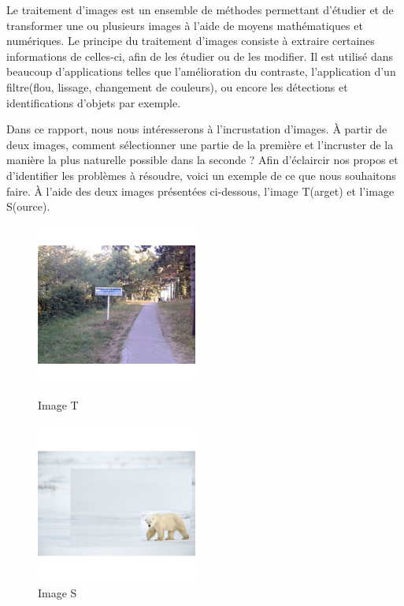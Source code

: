 
Le traitement d'images est un ensemble de méthodes permettant d'étudier et de transformer une ou plusieurs images à l'aide de moyens mathématiques et numériques. Le principe du traitement d'images consiste à extraire certaines informations de celles-ci, afin de les étudier ou de les modifier. Il est utilisé dans beaucoup d'applications telles que l'amélioration du contraste, l'application d'un filtre(flou, lissage, changement de couleurs), ou encore les détections et identifications d'objets par exemple. 

Dans ce rapport, nous nous intéresserons à l'incrustation d'images. À partir de deux images, comment sélectionner une partie de la première et l'incruster de la manière la plus naturelle possible dans la seconde ? 
\newline
Afin d'éclaircir nos propos et d'identifier les problèmes à résoudre, voici un exemple de ce que nous souhaitons faire.\newline
À l'aide des deux images présentées ci-dessous, l'image T(arget) et l'image S(ource). 
\newline
\begin{figure}[!htb]
   \begin{minipage}{0.48\textwidth}
     \centering
     \includegraphics[width = 150pt]{Annexe/OursT.png}
     \caption{Image T}
      \end{minipage}\hfill
   \begin{minipage}{0.48\textwidth}
     \centering
     \includegraphics[width= 150pt]{Annexe/OursS.png}
     \caption{Image S}\label{Fig:Data2}
   \end{minipage}
\end{figure}

